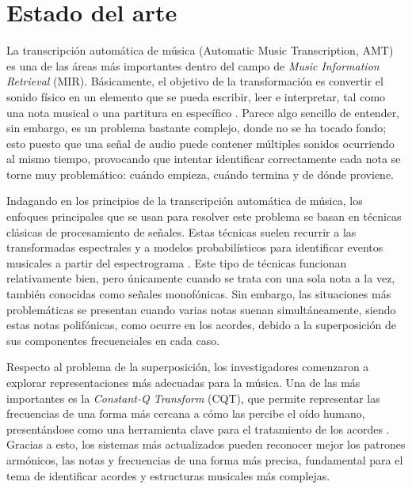 \section{Estado del arte}

La transcripción automática de música (Automatic Music Transcription, AMT) es una de las áreas más importantes dentro del campo de \textit{Music Information Retrieval} (MIR). Básicamente, el objetivo de la transformación es convertir el sonido físico en un elemento que se pueda escribir, leer e interpretar, tal como una nota musical o una partitura en específico \cite{benetos2018amt}. Parece algo sencillo de entender, sin embargo, es un problema bastante complejo, donde no se ha tocado fondo; esto puesto que una señal de audio puede contener múltiples sonidos ocurriendo al mismo tiempo, provocando que intentar identificar correctamente cada nota se torne muy problemático: cuándo empieza, cuándo termina y de dónde proviene.

Indagando en los principios de la transcripción automática de música, los enfoques principales que se usan para resolver este problema se basan en técnicas clásicas de procesamiento de señales. Estas técnicas suelen recurrir a las transformadas espectrales y a modelos probabilísticos para identificar eventos musicales a partir del espectrograma \cite{klapuri2006transcription}. Este tipo de técnicas funcionan relativamente bien, pero únicamente cuando se trata con una sola nota a la vez, también conocidas como señales monofónicas. Sin embargo, las situaciones más problemáticas se presentan cuando varias notas suenan simultáneamente, siendo estas notas polifónicas, como ocurre en los acordes, debido a la superposición de sus componentes frecuenciales en cada caso.

Respecto al problema de la superposición, los investigadores comenzaron a explorar representaciones más adecuadas para la música. Una de las más importantes es la \textit{Constant-Q Transform} (CQT), que permite representar las frecuencias de una forma más cercana a cómo las percibe el oído humano, presentándose como una herramienta clave para el tratamiento de los acordes \cite{sigtia2020representation}. Gracias a esto, los sistemas más actualizados pueden reconocer mejor los patrones armónicos, las notas y frecuencias de una forma más precisa, fundamental para el tema de identificar acordes y estructuras musicales más complejas.

